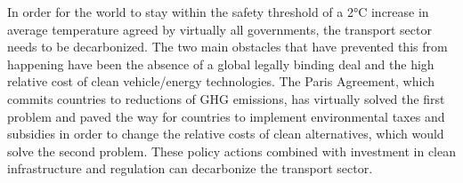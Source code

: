 In order for the world to stay within the safety threshold of a 2°C increase in average temperature agreed by virtually all governments, the transport sector needs to be decarbonized. The two main obstacles that have prevented this from happening have been the absence of a global legally binding deal and the high relative cost of clean vehicle/energy technologies. The Paris Agreement, which commits countries to reductions of GHG emissions, has virtually solved the first problem and paved the way for countries to implement environmental taxes and subsidies in order to change the relative costs of clean alternatives, which would solve the second problem. These policy actions combined with investment in clean infrastructure and regulation can decarbonize the transport sector.
